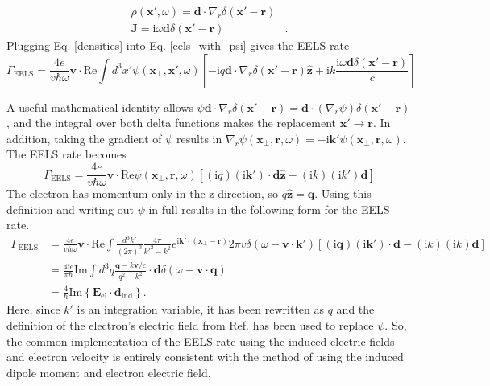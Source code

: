 \documentclass [11pt, proquest] {uwthesis}[2016/11/22]
\begin{document}
\begin{equation}
\begin{aligned}
\rho(\textbf{x}',\omega) = \textbf{d}\cdot\nabla_{r}\delta(\textbf{x}'-\textbf{r})&\\
\textbf{J} = \textrm{i}\omega\textbf{d}\delta(\textbf{x}'-\textbf{r})&.
\label{densities}
\end{aligned}
\end{equation} 
Plugging Eq. \ref{densities} into Eq. \ref{eels_with_psi} gives the EELS rate
\begin{equation}
\Gamma_{\textrm{EELS}} = \frac{4e}{v\hbar\omega}\textbf{v}\cdot\textrm{Re}\int d^3x' \psi(\textbf{x}_{\perp},\textbf{x}',\omega) \left[-\textrm{i}q \textbf{d}\cdot\nabla_{r}\delta(\textbf{x}'-\textbf{r})\hat{\textbf{z}} + \textrm{i}k\frac{\textrm{i}\omega\textbf{d}\delta(\textbf{x}'-\textbf{r})}{c}\right]
\label{eels_with_densities}
\end{equation}

A useful mathematical identity allows $\psi\textbf{d}\cdot\nabla_r\delta(\textbf{x}'-\textbf{r}) = \textbf{d}\cdot(\nabla_r\psi)\delta(\textbf{x}'-\textbf{r})$, and the integral over both delta functions makes the replacement $\textbf{x}' \rightarrow \textbf{r}$. In addition, taking the gradient of $\psi$ results in $\nabla_r\psi(\textbf{x}_{\perp},\textbf{r},\omega) = -\textrm{i}\textbf{k}'\psi(\textbf{x}_{\perp},\textbf{r},\omega)$. The EELS rate becomes
\begin{equation}
\Gamma_{\textrm{EELS}} = \frac{4e}{v\hbar\omega}\textbf{v}\cdot \textrm{Re}\psi(\textbf{x}_{\perp},\textbf{r},\omega) \left[(\textrm{i}q)(\textrm{i}\textbf{k}') \cdot \textbf{d}\hat{\textbf{z}} - (\textrm{i}k)(\textrm{i}k')\textbf{d}\right]
\end{equation}
The electron has momentum only in the z-direction, so $q\hat{\textbf{z}} = \textbf{q}$. Using this definition and writing out $\psi$ in full results in the following form for the EELS rate.
\begin{equation}
\begin{aligned}
\Gamma_{\textrm{EELS}} &= \frac{4e}{v\hbar\omega}\textbf{v}\cdot \textrm{Re}\int \frac{d^3k'}{(2\pi)^3} \frac{4\pi}{k'^2 - k^2} e^{\textrm{i}\textbf{k}'\cdot(\textbf{x}_{\perp}-\textbf{r})} 2\pi v \delta(\omega-\textbf{v}\cdot\textbf{k}') \left[(\textrm{i}\textbf{q})(\textrm{i}\textbf{k}') \cdot \textbf{d} - (\textrm{i}k)(\textrm{i}k)\textbf{d}\right]\\
&= \frac{4\textrm{i}e}{\pi\hbar} \textrm{Im}\int d^3q \frac{\textbf{q} - k\textbf{v}/c}{q^2 - k^2} \cdot \textbf{d} \delta(\omega - \textbf{v} \cdot \textbf{q})\\
&= \frac{4}{\hbar}\textrm{Im}\left\{ \textbf{E}_{\textrm{el}} \cdot \textbf{d}_{\textrm{ind}}\right\}.
\end{aligned}
\end{equation}
Here, since $k'$ is an integration variable, it has been rewritten as $q$ and the definition of the electron's electric field from Ref. \cite{AbajoRevMod} has been used to replace $\psi$. So, the common implementation of the EELS rate using the induced electric fields and electron velocity is entirely consistent with the method of using the induced dipole moment and electron electric field.
\end{document}
